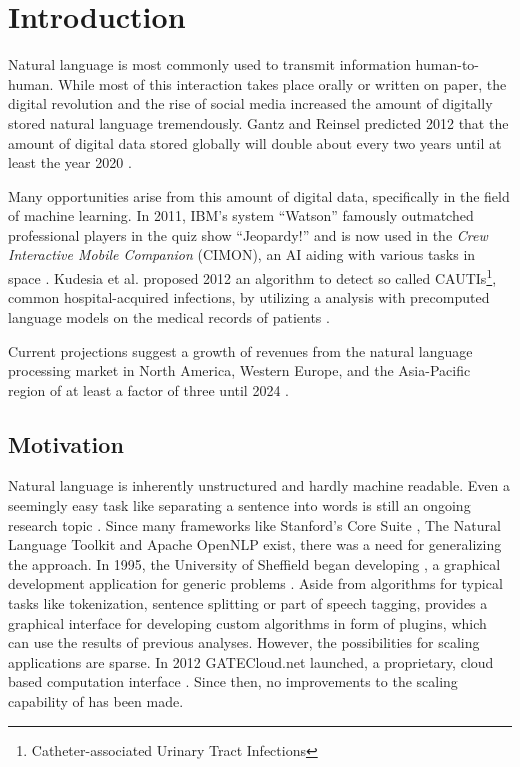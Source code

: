 
\chapter{Introduction}


Natural language is most commonly used to transmit information human-to-human. While most of this interaction takes place orally or written on paper, the digital revolution and the rise of social media increased the amount of digitally stored natural language tremendously. Gantz and Reinsel predicted 2012 that the amount of digital data stored globally will double about every two years until at least the year 2020 \cite{gantz2012digital}.

Many opportunities arise from this amount of digital data, specifically in the field of machine learning. In 2011, IBM's \qa{} system ``Watson'' famously outmatched professional players in the quiz show ``Jeopardy!'' \cite{ferrucci2012introduction,epstein2012making} and is now used in the \emph{Crew Interactive Mobile Companion} (CIMON), an AI aiding with various tasks in space \cite{cimon}. Kudesia et al. proposed 2012 an algorithm to detect so called CAUTIs\footnote{Catheter-associated Urinary Tract Infections}, common hospital-acquired infections, by utilizing a \nlp{} analysis with precomputed language models on the medical records of patients \cite{kudesia2012natural}.

Current projections suggest a growth of revenues from the natural language processing market in North America, Western Europe, and the Asia-Pacific region of at least a factor of three until 2024 \cite{stat:nlpeurope,stat:nlpamerica,stat:nlpasia}.

\section{Motivation}

Natural language is inherently unstructured and hardly machine readable. Even a seemingly easy task like separating a sentence into words is still an ongoing research topic \cite{pak2018text}. Since many \nlp{} frameworks like Stanford's Core \nlp Suite \cite{manning-EtAl:2014:P14-5}, The Natural Language Toolkit \cite{bird2004nltk} and Apache OpenNLP \cite{opennlp} exist, there was a need for generalizing the \nlp{} approach. In 1995, the University of Sheffield began developing \nlpGate{}, a graphical development application for generic \nlp{} problems \cite{cunningham2002gate}. Aside from algorithms for typical \nlp{} tasks like tokenization, sentence splitting or part of speech tagging, \nlpGate{} provides a graphical interface for developing custom algorithms in form of plugins, which can use the results of previous \nlp{} analyses. However, the possibilities for scaling \nlpGate{} applications are sparse. In 2012 GATECloud.net launched, a proprietary, cloud based \nlpGate{} computation interface \cite{tablan2013gatecloud}. Since then, no improvements to the scaling capability of \nlpGate{} has been made. 

